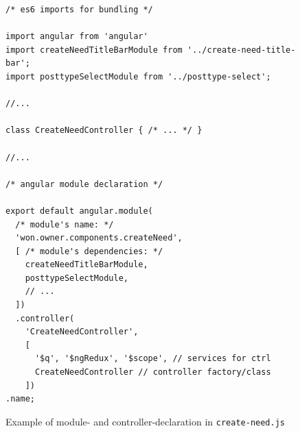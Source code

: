 \begin{figure}
\centering
\begin{verbatim}
/* es6 imports for bundling */

import angular from 'angular'
import createNeedTitleBarModule from '../create-need-title-bar';
import posttypeSelectModule from '../posttype-select';

//...

class CreateNeedController { /* ... */ }

//...

/* angular module declaration */

export default angular.module(
  /* module's name: */
  'won.owner.components.createNeed', 
  [ /* module's dependencies: */
    createNeedTitleBarModule,
    posttypeSelectModule,
    // ...
  ])
  .controller(
    'CreateNeedController', 
    [
      '$q', '$ngRedux', '$scope', // services for ctrl
      CreateNeedController // controller factory/class
    ])
.name;
\end{verbatim}
\caption{Example of module- and controller-declaration in \texttt{create-need.js}}
\label{fig:ng-duplicate-dependencies}
\end{figure}

